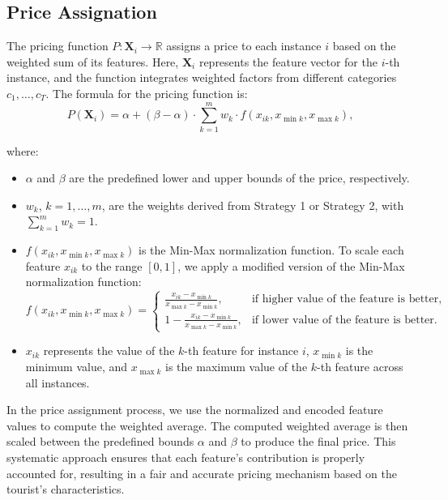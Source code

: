 \documentclass[12pt]{book}
\begin{document}
\subsection{Price Assignation}

The pricing function $P: \mathbf{X}_i \rightarrow \mathbb{R}$ assigns a price to each instance $i$ based on the weighted sum of its features. Here, $\mathbf{X}_i$ represents the feature vector for the $i$-th instance, and the function integrates weighted factors from different categories $c_1, \ldots, c_T$. The formula for the pricing function is:
\[
P(\mathbf{X}_i) = \alpha + (\beta - \alpha) \cdot \sum_{k=1}^{m} w_k \cdot f(x_{ik}, x_{\min k}, x_{\max k}),
\]

where:
\begin{itemize}
    \item $\alpha$ and $\beta$ are the predefined lower and upper bounds of the price, respectively.
    \item $w_k$, $k=1, \ldots, m$, are the weights derived from Strategy 1 or Strategy 2, with $\sum_{k=1}^{m} w_k = 1$.
    \item $f(x_{ik}, x_{\min k}, x_{\max k})$ is the Min-Max normalization function. To scale each feature $x_{ik}$ to the range $[0, 1]$, we apply a modified version of the Min-Max normalization function:
    \[
    f(x_{ik}, x_{\min k}, x_{\max k}) = \begin{cases}
        \frac{x_{ik} - x_{\min k}}{x_{\max k} - x_{\min k}}, & \text{if higher value of the feature is better}, \\
        1 - \frac{x_{ik} - x_{\min k}}{x_{\max k} - x_{\min k}}, & \text{if lower value of the feature is better}.
    \end{cases}
    \]
    \item $x_{ik}$ represents the value of the $k$-th feature for instance $i$, $x_{\min k}$ is the minimum value, and $x_{\max k}$ is the maximum value of the $k$-th feature across all instances.
\end{itemize}

In the price assignment process, we use the normalized and encoded feature values to compute the weighted average. The computed weighted average is then scaled between the predefined bounds $\alpha$ and $\beta$ to produce the final price. This systematic approach ensures that each feature's contribution is properly accounted for, resulting in a fair and accurate pricing mechanism based on the tourist's characteristics.
\end{document}
